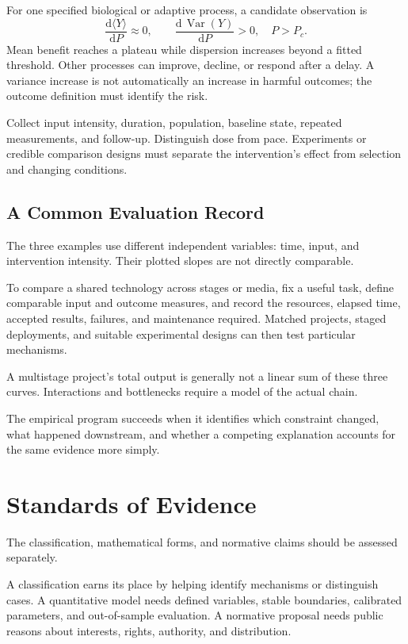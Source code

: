 \documentclass[11pt,openany]{book}
\begin{document}
For one specified biological or adaptive process, a candidate observation is
\begin{equation}
 \frac{\mathrm d\langle Y\rangle}{\mathrm dP}\approx0,
 \qquad
 \frac{\mathrm d\,\operatorname{Var}(Y)}{\mathrm dP}>0,
 \quad P>P_c.
\end{equation}
Mean benefit reaches a plateau while dispersion increases beyond a fitted threshold. Other processes can improve, decline, or respond after a delay. A variance increase is not automatically an increase in harmful outcomes; the outcome definition must identify the risk.

Collect input intensity, duration, population, baseline state, repeated measurements, and follow-up. Distinguish dose from pace. Experiments or credible comparison designs must separate the intervention's effect from selection and changing conditions.

\subsection{A Common Evaluation Record}

The three examples use different independent variables: time, input, and intervention intensity. Their plotted slopes are not directly comparable.

To compare a shared technology across stages or media, fix a useful task, define comparable input and outcome measures, and record the resources, elapsed time, accepted results, failures, and maintenance required. Matched projects, staged deployments, and suitable experimental designs can then test particular mechanisms.

A multistage project's total output is generally not a linear sum of these three curves. Interactions and bottlenecks require a model of the actual chain.

The empirical program succeeds when it identifies which constraint changed, what happened downstream, and whether a competing explanation accounts for the same evidence more simply.

\section{Standards of Evidence}

The classification, mathematical forms, and normative claims should be assessed separately.

A classification earns its place by helping identify mechanisms or distinguish cases. A quantitative model needs defined variables, stable boundaries, calibrated parameters, and out-of-sample evaluation. A normative proposal needs public reasons about interests, rights, authority, and distribution.
\end{document}
